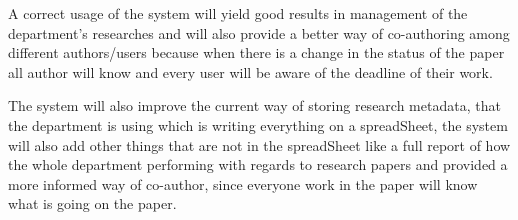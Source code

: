 \documentclass[a4paper,12pt]{report}
\begin{document}
A correct usage of the system will yield good results in management of the department's researches and will also provide a better way of co-authoring among different authors/users because when there is a change in the status of the paper all author will know and every user will be aware of the deadline of their work.

The system will also improve the current way of storing research metadata, that the department is using which is  writing everything on a spreadSheet, the system will also add other things that are not in the spreadSheet like a full report of how the whole department performing with regards to research papers and provided a more informed way of co-author, since everyone work in the paper will know what is going on the paper.
\end{document}
